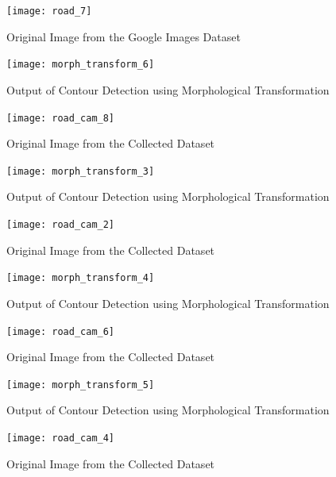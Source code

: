 \begin{enumerate}
\begin{enumerate}
    \begin{figure}[ht!]
        \centering
        \texttt{[image: road\_7]}
        \caption{Original Image from the Google Images Dataset}
    \end{figure}

    \begin{figure}[ht!]
        \centering
        \texttt{[image: morph\_transform\_6]}
        \caption{Output of Contour Detection using Morphological Transformation}
    \end{figure}
    \pagebreak
    
    \begin{figure}[ht!]
        \centering
        \texttt{[image: road\_cam\_8]}
        \caption{Original Image from the Collected Dataset}
    \end{figure}

    \begin{figure}[ht!]
        \centering
        \texttt{[image: morph\_transform\_3]}
        \caption{Output of Contour Detection using Morphological Transformation}
    \end{figure}
    \pagebreak
    
    \begin{figure}[ht!]
        \centering
        \texttt{[image: road\_cam\_2]}
        \caption{Original Image from the Collected Dataset}
    \end{figure}

    \begin{figure}[ht!]
        \centering
        \texttt{[image: morph\_transform\_4]}
        \caption{Output of Contour Detection using Morphological Transformation}
    \end{figure}
    \pagebreak
    
    \begin{figure}[ht!]
        \centering
        \texttt{[image: road\_cam\_6]}
        \caption{Original Image from the Collected Dataset}
    \end{figure}

    \begin{figure}[ht!]
        \centering
        \texttt{[image: morph\_transform\_5]}
        \caption{Output of Contour Detection using Morphological Transformation}
    \end{figure}
    \pagebreak
    
    \begin{figure}[ht!]
        \centering
        \texttt{[image: road\_cam\_4]}
        \caption{Original Image from the Collected Dataset}
    \end{figure}


\end{enumerate}
\end{enumerate}
